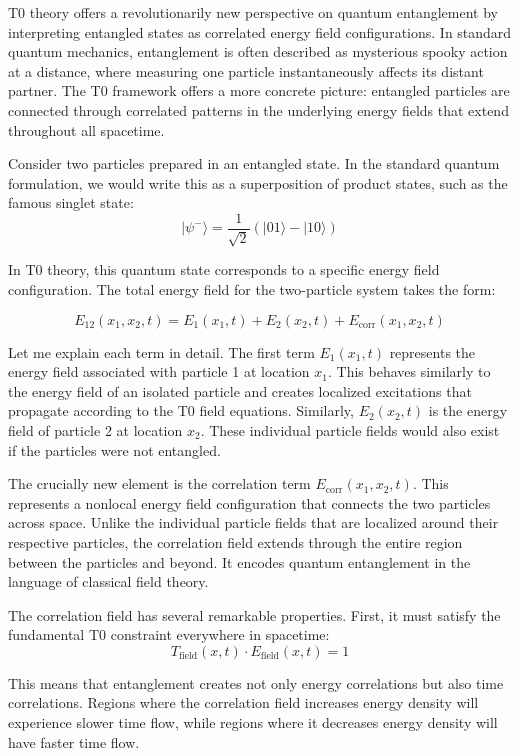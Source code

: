 \documentclass[12pt,a4paper]{article}
\theoremstyle{definition}
\theoremstyle{remark}
\begin{document}
	T0 theory offers a revolutionarily new perspective on quantum entanglement by interpreting entangled states as correlated energy field configurations. In standard quantum mechanics, entanglement is often described as mysterious spooky action at a distance, where measuring one particle instantaneously affects its distant partner. The T0 framework offers a more concrete picture: entangled particles are connected through correlated patterns in the underlying energy fields that extend throughout all spacetime.
	
	Consider two particles prepared in an entangled state. In the standard quantum formulation, we would write this as a superposition of product states, such as the famous singlet state:
	$$|\psi^-\rangle = \frac{1}{\sqrt{2}}(|01\rangle - |10\rangle)$$
	
	In T0 theory, this quantum state corresponds to a specific energy field configuration. The total energy field for the two-particle system takes the form:
	
	\begin{equation}
		E_{12}(x_1,x_2,t) = E_1(x_1,t) + E_2(x_2,t) + E_{\text{corr}}(x_1,x_2,t)
		\label{eq:entangled_energy}
	\end{equation}
	
	Let me explain each term in detail. The first term $E_1(x_1,t)$ represents the energy field associated with particle 1 at location $x_1$. This behaves similarly to the energy field of an isolated particle and creates localized excitations that propagate according to the T0 field equations. Similarly, $E_2(x_2,t)$ is the energy field of particle 2 at location $x_2$. These individual particle fields would also exist if the particles were not entangled.
	
	The crucially new element is the correlation term $E_{\text{corr}}(x_1,x_2,t)$. This represents a nonlocal energy field configuration that connects the two particles across space. Unlike the individual particle fields that are localized around their respective particles, the correlation field extends through the entire region between the particles and beyond. It encodes quantum entanglement in the language of classical field theory.
	
	The correlation field has several remarkable properties. First, it must satisfy the fundamental T0 constraint everywhere in spacetime:
	$$T_{\text{field}}(x,t) \cdot E_{\text{field}}(x,t) = 1$$
	
	This means that entanglement creates not only energy correlations but also time correlations. Regions where the correlation field increases energy density will experience slower time flow, while regions where it decreases energy density will have faster time flow.
	
\end{document}
